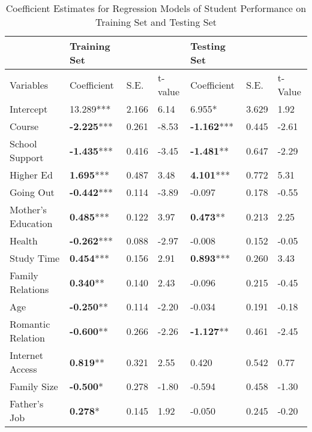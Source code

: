 \documentclass[sigconf]{acmart}
\begin{document}

\begin{table*}[ht]
  \caption{Coefficient Estimates for Regression Models of Student Performance on 
  Training Set and Testing Set}
  \label{tab:freq}
  \begin{tabular}{lllllll}
    \toprule
                        & Training Set      &        &         & Testing Set &         &          \\
    \midrule
    Variables           & Coefficient        & S.E.  & t-value & Coefficient & S.E. & t-Value  \\
    \midrule
    Intercept           &       13.289***    & 2.166 &  6.14  &          6.955*     & 3.629 &  1.92 \\
    Course              & \textbf{-2.225}*** & 0.261 & -8.53  & \textbf{-1.162}***  & 0.445 & -2.61 \\
    School Support      & \textbf{-1.435}*** & 0.416 & -3.45  & \textbf{-1.481}**   & 0.647 & -2.29 \\
    Higher Ed           & \textbf{ 1.695}*** & 0.487 &  3.48  & \textbf{ 4.101}***  & 0.772 &  5.31 \\
    Going Out           & \textbf{-0.442}*** & 0.114 & -3.89  &         -0.097      & 0.178 & -0.55 \\
    Mother's Education  & \textbf{ 0.485}*** & 0.122 &  3.97  & \textbf{ 0.473}**   & 0.213 &  2.25 \\
    Health              & \textbf{-0.262}*** & 0.088 & -2.97  &         -0.008      & 0.152 & -0.05 \\
    Study Time          & \textbf{ 0.454}*** & 0.156 &  2.91  & \textbf{ 0.893}***  & 0.260 &  3.43 \\
    Family Relations    & \textbf{ 0.340}**  & 0.140 &  2.43  &         -0.096      & 0.215 & -0.45 \\
    Age                 & \textbf{-0.250}**  & 0.114 & -2.20  &         -0.034      & 0.191 & -0.18 \\
    Romantic Relation   & \textbf{-0.600}**  & 0.266 & -2.26  & \textbf{-1.127}**   & 0.461 & -2.45 \\
    Internet Access     & \textbf{ 0.819}**  & 0.321 &  2.55  &          0.420      & 0.542 &  0.77 \\
    Family Size         & \textbf{-0.500}*   & 0.278 & -1.80  &         -0.594      & 0.458 & -1.30 \\
    Father's Job        & \textbf{ 0.278}*   & 0.145 &  1.92  &         -0.050      & 0.245 & -0.20 \\

\end{tabular}
\end{table*}
\end{document}
